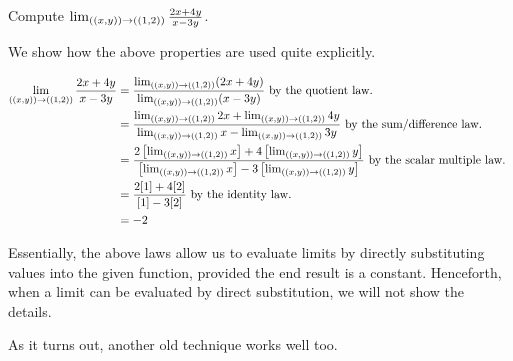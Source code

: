 \documentclass{ximera}
\begin{document}
\begin{example}
Compute $\lim_{\left(\left(x,y\right)\right) \to \left(\left(1,2\right)\right)} \frac{2x+4y}{x-3y}$.  

\begin{explanation}
We show how the above properties are used quite explicitly.

\begin{align*}
\lim_{\left(\left(x,y\right)\right) \to \left(\left(1,2\right)\right)} \frac{2x+4y}{x-3y} & = \frac{\lim_{\left(\left(x,y\right)\right) \to \left(\left(1,2\right)\right)}(2x+4y)}{\lim_{\left(\left(x,y\right)\right) \to \left(\left(1,2\right)\right)}(x-3y)} \textrm{ by the quotient law. } \\
&=  \frac{\lim_{\left(\left(x,y\right)\right) \to \left(\left(1,2\right)\right)}2x+\lim_{\left(\left(x,y\right)\right) \to \left(\left(1,2\right)\right)} 4y}{\lim_{\left(\left(x,y\right)\right) \to \left(\left(1,2\right)\right)}x-\lim_{\left(\left(x,y\right)\right) \to \left(\left(1,2\right)\right)}3y}  \textrm{ by the sum/difference law. } \\
&=  \frac{2\left[\lim_{\left(\left(x,y\right)\right) \to \left(\left(1,2\right)\right)}x\right]+4\left[\lim_{\left(\left(x,y\right)\right) \to \left(\left(1,2\right)\right)} y\right]}{\left[\lim_{\left(\left(x,y\right)\right) \to \left(\left(1,2\right)\right)}x\right]-3\left[\lim_{\left(\left(x,y\right)\right) \to \left(\left(1,2\right)\right)}y\right]}  \textrm{ by the scalar multiple law. } \\
&= \frac{2[1]+4[2]}{[1]-3[2]} \textrm{ by the identity law. } \\
&= -2
\end{align*}
\end{explanation}
\end{example}

Essentially, the above laws allow us to evaluate limits by directly substituting values into the given function, provided the end result is a constant.  Henceforth, when a limit can be evaluated by direct substitution, we will not show the details.  

As it turns out, another old technique works well too.

    
    
\end{document}
